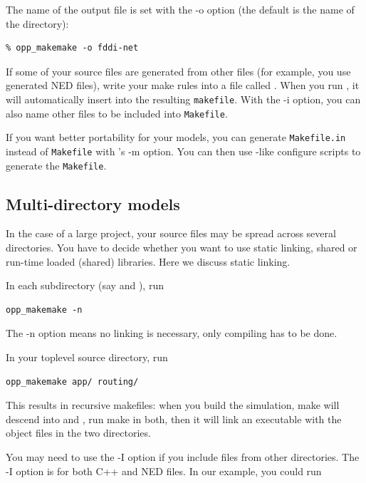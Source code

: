 The name of the output file is set with the -o
option (the default is the name of the directory):

\begin{verbatim}
% opp_makemake -o fddi-net
\end{verbatim}

If some of your source files are generated from other files (for
example, you use generated NED files), write your make rules
into a file called . When you run , it
will automatically insert  into the resulting \texttt{makefile}.
With the -i option, you can also name other files to be included into
\texttt{Makefile}.


If you want better portability for your models, you can generate
\texttt{Makefile.in} instead of \texttt{Makefile} with 's
-m option. You can then use -like configure scripts to generate
the \texttt{Makefile}.




\subsection{Multi-directory models}

In the case of a large project, your source files may be spread across
several directories. You have to decide whether you want to use static
linking, shared or run-time loaded (shared)
libraries. Here we discuss static linking.


In each subdirectory (say  and ), run

\begin{verbatim}
opp_makemake -n
\end{verbatim}

The -n option means no linking is necessary, only compiling has
to be done.

In your toplevel source directory, run

\begin{verbatim}
opp_makemake app/ routing/
\end{verbatim}

This results in recursive makefiles: when you build the simulation, make
will descend into  and , run make in both, then
it will link an executable with the object files in the two directories.


You may need to use the -I option if you include files from other
directories. The -I option is for both C++ and NED
files. In our example, you could run

